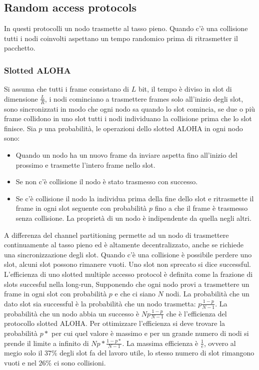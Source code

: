 \subsection{Random access protocols}
In questi protocolli un nodo trasmette al tasso pieno. Quando c'\`e una collisione tutti i nodi coinvolti aspettano un tempo randomico prima di ritrasmetter il pacchetto. 
\subsubsection{Slotted ALOHA}
Si assuma che tutti i frame consistano di $L$ bit, il tempo \`e diviso in slot di dimensione $\frac{L}{R}$, i nodi cominciano a trasmettere frames solo all'inizio degli slot, sono sincronizzati in modo che ogni nodo
sa quando lo slot comincia, se due o pi\`u frame collidono in uno slot tutti i nodi individuano la collisione prima che lo slot finisce. Sia $p$ una probabilit\`a, le operazioni dello slotted ALOHA in ogni nodo sono:
\begin{itemize}
\item Quando un nodo ha un nuovo frame da inviare aspetta fino all'inizio del prossimo e trasmette l'intero frame nello slot.
\item Se non c'\`e collisione il nodo \`e stato trasmesso con successo.
\item Se c'\`e collisione il nodo la individua prima della fine dello slot e ritrasmette il frame in ogni slot seguente con probabilit\`a $p$ fino a che il frame \`e trasmesso senza collisione. La propriet\`a di un nodo
\`e indipendente da quella negli altri.
\end{itemize}
A differenza del channel partitioning permette ad un nodo di trasmettere continuamente al tasso pieno ed \`e altamente decentralizzato, anche se richiede una sincronizzazione degli slot. Quando c'\`e una 
collisione \`e possibile perdere uno slot, alcuni slot possono rimanere vuoti. Uno slot non sprecato si dice successful. L'efficienza di uno slotted multiple accesso protocol \`e definita come la frazione di slots
succesful nella long-run, Supponendo che ogni nodo provi a trasmettere un frame in ogni slot con probabilit\`a $p$ e che ci siano $N$ nodi.  La probabilit\`a che un dato slot sia successful \`e la probabilit\`a che
un nodo trasmetta: $p\frac{1-p}{N-1}$. La probabilit\`a che un nodo abbia un successo \`e $Np\frac{1-p}{N-1}$ che \`e l'efficienza del protocollo slotted ALOHA. Per ottimizzare l'efficienza si deve trovare la
probabilit\`a $p*$ per cui quel valore \`e massimo e per un grande numero di nodi si prende il limite a infinito di $Np*\frac{1-p*}{N-1}$. La massima efficienza \`e  $\frac{1}{e}$, ovvero al megio solo il $37\%$ 
degli slot fa del lavoro utile, lo stesso numero di slot rimangono vuoti e nel $26\%$ ci sono collisioni. 
